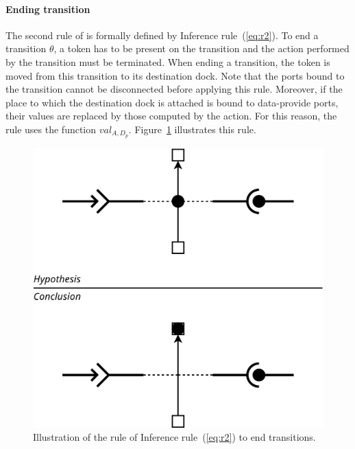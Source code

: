 \paragraph{Ending transition}{

The second rule of \mad is formally defined by
Inference rule~(\ref{eq:r2}). To end a transition $\theta$, a token has to
be present on the transition and the action performed by the
transition must be terminated. When ending a transition, the token
is moved from this transition to its destination dock. Note that the ports bound
to the transition cannot be disconnected before applying this rule. Moreover, if
the place to which the destination dock is attached is bound to
data-provide ports, their values are replaced by those computed by the action.
For this reason, the rule uses the function
$val_{A,D_p}$. Figure~\ref{fig:r2} illustrates this rule.

\begin{figure}[t]
\begin{center}
  \includegraphics[width=0.55\columnwidth]{./images/ending_transition.pdf}
\end{center}
\caption{Illustration of the rule of Inference rule~(\ref{eq:r2}) to end transitions.}
\label{fig:r2}
\end{figure}
  
}

